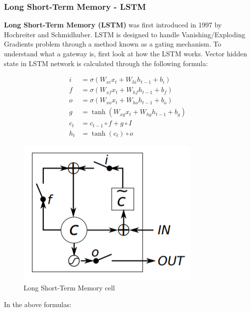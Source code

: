\subsubsection{Long Short-Term Memory - LSTM}

\textbf{Long Short-Term Memory (LSTM)} was first introduced in 1997 by Hochreiter and Schmidhuber. LSTM is designed to handle Vanishing/Exploding Gradients problem through a method known as a gating mechanism. To understand what a gateway is, first look at how the LSTM works. Vector hidden state in LSTM network is calculated through the following formula:

\begin{align}
i &= \sigma ( W_{xi}x_{t} + W _{hi}h _{t-1} + b _{i}) \\
f &= \sigma(W_{xf}x_{t} + W_{hf}h_{t-1} + b_{f}) \\
o &= \sigma(W_{xo}x_{t} + W_{ho}h_{t-1} + b_{o})	\\
g &= \tanh (W_{xg}x_{t} + W_{hg}h_{t-1} + b_{g})	\\
c_{t} &= c_{t-1} \circ f+ g \circ I	\\
h_{t} &= \tanh(c_{t}) \circ o
\end{align}
\begin{center}
  \begin{figure}[H]
  \centering
  \includegraphics[width=0.5\columnwidth]{images/chap2/LSTM.png}
  \caption{Long Short-Term Memory cell \cite{DBLP:journals/corr/DonahueHGRVSD14}}
  \label{chap2:WSP}
  \end{figure}
\end{center}
\vspace{-1cm}
In the above formulas:

